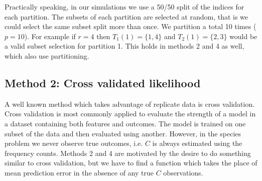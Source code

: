 \documentclass[oupdraft]{bio}
\begin{document}
Practically speaking, in our simulations we use a 50/50 split of the indices for each partition.  The subsets of each partition are selected at random, that is we could select the same subset split more than once.  We partition a total 10 times ($p = 10$).  For example if $r = 4$ then $T_1(1) = \{1,4\}$ and $T_2(1) = \{2, 3\}$ would be a valid subset selection for partition 1.  This holds in methods 2 and 4 as well, which also use partitioning.

%
%
%
\subsection{Method 2: Cross validated likelihood}
A well known method which takes advantage of replicate data is cross validation.  Cross validation is most commonly applied to evaluate the strength of a model in a dataset containing both features and outcomes.  The model is trained on one subset of the data and then evaluated using another.  However, in the species problem we never observe true outcomes, i.e. $C$ is always estimated using the frequency counts.  Methods 2 and 4 are motivated by the desire to do something similar to cross validation, but we have to find a function which takes the place of mean prediction error in the absence of any true $C$ observations.
\end{document}

